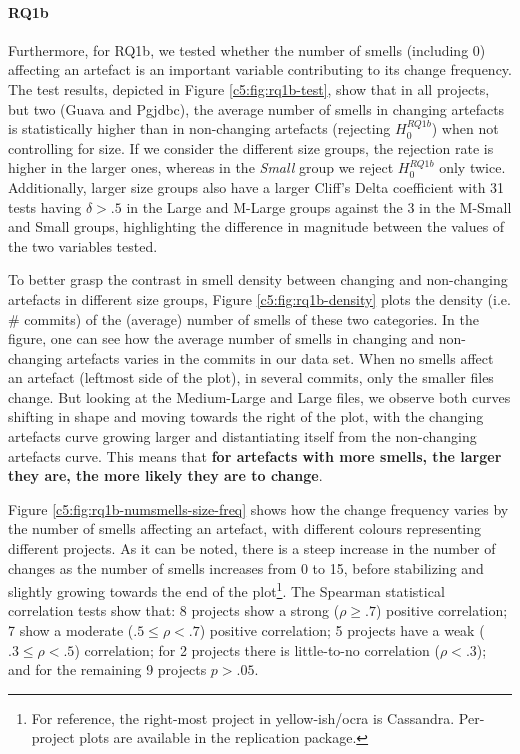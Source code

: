 \paragraph{RQ1b}
Furthermore, for RQ1b, we tested whether the number of smells (including 0) affecting an artefact is an important variable contributing to its change frequency.
The test results, depicted in Figure \ref{c5:fig:rq1b-test}, show that in all projects, but two (Guava and Pgjdbc), the average number of smells in changing artefacts is statistically higher than in non-changing artefacts (rejecting $H^{RQ1b}_0$) when not controlling for size.
If we consider the different size groups, the rejection rate is higher in the larger ones, whereas in the \emph{Small} group we reject $H^{RQ1b}_0$ only twice. Additionally, larger size groups also have a larger Cliff's Delta coefficient with 31 tests having $\delta > .5$ in the Large and M-Large groups against the 3 in the M-Small and Small groups, highlighting the difference in magnitude between the values of the two variables tested.

To better grasp the contrast in smell density between changing and non-changing artefacts in different size groups, Figure \ref{c5:fig:rq1b-density} plots the density (i.e. \# commits) of the (average) number of smells of these two categories.
In the figure, one can see how the average number of smells in changing and non-changing artefacts varies in the commits in our data set. When no smells affect an artefact (leftmost side of the plot), in several commits, only the smaller files change. But looking at the Medium-Large and Large files, we observe both curves shifting in shape and moving towards the right of the plot, with the changing artefacts curve growing larger and distantiating itself from the non-changing artefacts curve.
This means that \textbf{for artefacts with more smells, the larger they are, the more likely they are to change}.

Figure \ref{c5:fig:rq1b-numsmells-size-freq} shows how the change frequency varies by the number of smells affecting an artefact, with different colours representing different projects. 
As it can be noted, there is a steep increase in the number of changes as the number of smells increases from 0 to 15, before stabilizing and slightly growing towards the end of the plot\footnote{For reference, the right-most project in yellow-ish/ocra is Cassandra. Per-project plots are available in the replication package.}. 
The Spearman statistical correlation tests show that: 8 projects show a strong ($\rho \ge .7$) positive correlation; 7 show a moderate ($.5 \le \rho < .7$) positive correlation; 5 projects have a weak ($.3 \le \rho < .5$) correlation; for 2 projects there is little-to-no correlation ($ \rho <.3 $); and for the remaining 9 projects $p > .05$.

